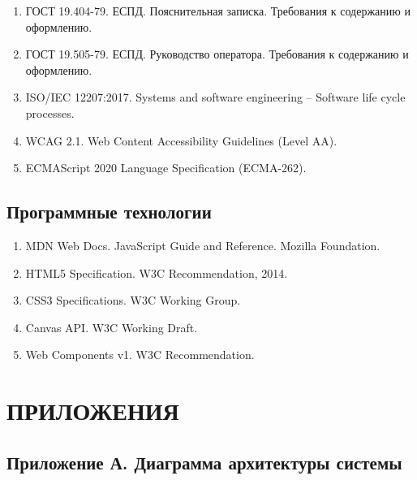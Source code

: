 \documentclass[14pt,russian]{extarticle}
\begin{document}
\begin{enumerate}
    \item ГОСТ 19.404-79. ЕСПД. Пояснительная записка. Требования к содержанию и оформлению.
    \item ГОСТ 19.505-79. ЕСПД. Руководство оператора. Требования к содержанию и оформлению.
    \item ISO/IEC 12207:2017. Systems and software engineering -- Software life cycle processes.
    \item WCAG 2.1. Web Content Accessibility Guidelines (Level AA).
    \item ECMAScript 2020 Language Specification (ECMA-262).
\end{enumerate}

\subsection{Программные технологии}

\begin{enumerate}
    \item MDN Web Docs. JavaScript Guide and Reference. Mozilla Foundation.
    \item HTML5 Specification. W3C Recommendation, 2014.
    \item CSS3 Specifications. W3C Working Group.
    \item Canvas API. W3C Working Draft.
    \item Web Components v1. W3C Recommendation.
\end{enumerate}

\section{ПРИЛОЖЕНИЯ}

\subsection{Приложение А. Диаграмма архитектуры системы}
\end{document}
